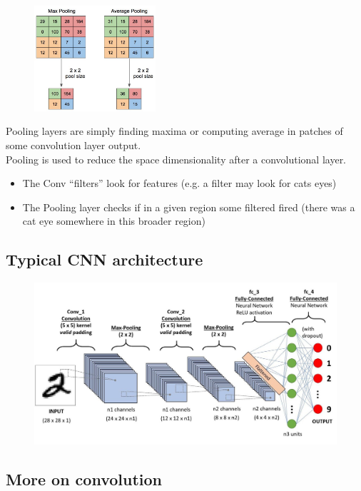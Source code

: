 \begin{figure}
	\includegraphics[width=0.4\textwidth]{figure_ml/pooling.png}
\end{figure}

Pooling layers are simply finding maxima or computing average in patches of some convolution layer output.\\
Pooling is used to reduce the space dimensionality after a convolutional layer.
\begin{itemize}
	\item The Conv “filters” look for features (e.g. a filter may look for cats eyes)
	\item The Pooling layer checks if in a given 	region some filtered fired (there was a cat eye somewhere in this broader region)
\end{itemize}

\subsection{Typical CNN architecture}

\begin{figure}[ht]
	\centering
	\includegraphics[width=1\linewidth]{figure_ml/cnn_arch.png}
\end{figure}
\FloatBarrier

\subsection{More on convolution}


